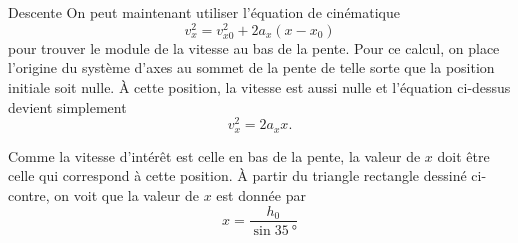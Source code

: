 \documentclass{tufte-handout}
\begin{document}
{\begin{subsection}{Descente}
    On peut maintenant utiliser l'équation de cinématique
    \begin{equation*}
      v_x^2 = v_{x0}^2 + 2a_x(x - x_0)
    \end{equation*}
    pour trouver le module de la vitesse au bas de la pente.  Pour ce calcul,
    on place l'origine du système d'axes au sommet de la pente de telle sorte
    que la position initiale soit nulle. À cette position, la vitesse est aussi
    nulle et l'équation ci-dessus devient simplement
    \begin{equation}
      \label{eq:vaax}
      v_x^2 = 2a_x x.
    \end{equation}
    \begin{marginfigure}
    \end{marginfigure}
    Comme la vitesse d'intérêt est celle en bas de la pente, la valeur de $x$
    doit être celle qui correspond à cette position. À partir du triangle
    rectangle dessiné ci-contre, on voit que la valeur de $x$ est donnée par
    \begin{equation}
      \label{eq:xtriang}
      x = \frac{h_0}{\sin\SI{35}{\degree}} 
    \end{equation}
    

\end{subsection}}
\end{document}
